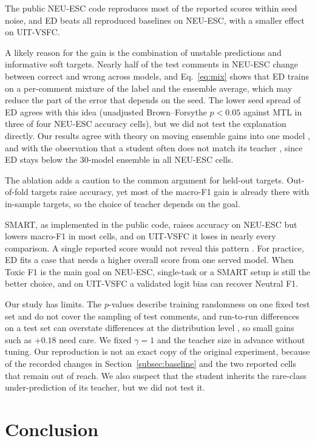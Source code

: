 \documentclass[pdflatex,sn-mathphys-num]{sn-jnl}%
\theoremstyle{thmstyleone}%
\theoremstyle{thmstyletwo}%
\theoremstyle{thmstylethree}%
\begin{document}
The public NEU-ESC code reproduces most of the reported scores within seed noise, and ED beats all reproduced baselines on NEU-ESC, with a smaller effect on UIT-VSFC.

A likely reason for the gain is the combination of unstable predictions and informative soft targets. Nearly half of the test comments in NEU-ESC change between correct and wrong across models, and Eq.~\ref{eq:mix} shows that ED trains on a per-comment mixture of the label and the ensemble average, which may reduce the part of the error that depends on the seed. The lower seed spread of ED agrees with this idea (unadjusted Brown--Forsythe $p<0.05$ against MTL in three of four NEU-ESC accuracy cells), but we did not test the explanation directly. Our results agree with theory on moving ensemble gains into one model \cite{allenzhu2023understanding}, and with the observation that a student often does not match its teacher \cite{stanton2021distillation}, since ED stays below the 30-model ensemble in all NEU-ESC cells.

The ablation adds a caution to the common argument for held-out targets. Out-of-fold targets raise accuracy, yet most of the macro-F1 gain is already there with in-sample targets, so the choice of teacher depends on the goal.

SMART, as implemented in the public code, raises accuracy on NEU-ESC but lowers macro-F1 in most cells, and on UIT-VSFC it loses in nearly every comparison. A single reported score would not reveal this pattern \cite{reimers2017reporting}. For practice, ED fits a case that needs a higher overall score from one served model. When Toxic F1 is the main goal on NEU-ESC, single-task or a SMART setup is still the better choice, and on UIT-VSFC a validated logit bias can recover Neutral F1.

Our study has limits. The $p$-values describe training randomness on one fixed test set and do not cover the sampling of test comments, and run-to-run differences on a test set can overstate differences at the distribution level \cite{jordan2024variance}, so small gains such as $+0.18$ need care. We fixed $\gamma=1$ and the teacher size in advance without tuning. Our reproduction is not an exact copy of the original experiment, because of the recorded changes in Section~\ref{subsec:baseline} and the two reported cells that remain out of reach. We also suspect that the student inherits the rare-class under-prediction of its teacher, but we did not test it.

\section{Conclusion}\label{sec:conclusion}
\end{document}

